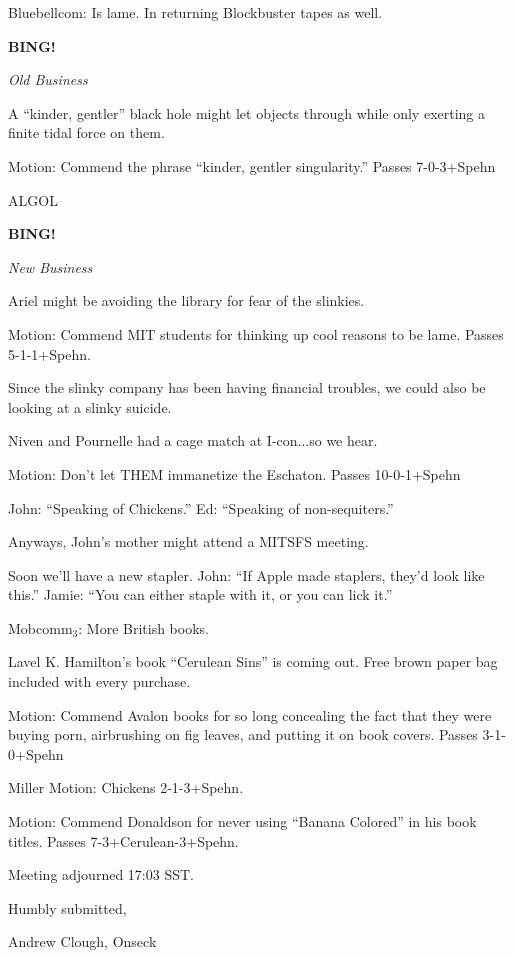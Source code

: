 \documentclass[12pt]{article}
\newcommand{\bing}{{\bf BING!} }
\newcommand{\goto}[1]{\bing \vskip 12pt \centerline{{\em{#1}}}}
\begin{document}
Bluebellcom:  Is lame.  In returning Blockbuster tapes as well.

\goto{Old Business}

A ``kinder, gentler'' black hole might let objects through while only exerting a finite tidal force on them.

Motion:  Commend the phrase ``kinder, gentler singularity.'' Passes 7-0-3+Spehn

ALGOL

\goto{New Business}

Ariel might be avoiding the library for fear of the slinkies.

Motion:  Commend MIT students for thinking up cool reasons to be lame.  Passes 5-1-1+Spehn.

Since the slinky company has been having financial troubles, we could also be looking at a slinky suicide.

Niven and Pournelle had a cage match at I-con...so we hear.

Motion:  Don't let THEM immanetize the Eschaton. Passes 10-0-1+Spehn

John:  ``Speaking of Chickens.''  Ed:  ``Speaking of non-sequiters.''

Anyways, John's mother might attend a MITSFS meeting.

Soon we'll have a new stapler.  John:  ``If Apple made staplers, they'd look like this.''  Jamie:  ``You can either staple with it, or you can lick it.''

Mobcomm$_3$:  More British books.

Lavel K. Hamilton's book ``Cerulean Sins'' is coming out.  Free brown paper bag included with every purchase.

Motion:   Commend Avalon books for so long concealing the fact that they were buying porn, airbrushing on fig leaves, and putting it on book covers.  Passes 3-1-0+Spehn

Miller Motion:  Chickens 2-1-3+Spehn.

Motion: Commend Donaldson for never using ``Banana Colored'' in his book titles.  Passes 7-3+Cerulean-3+Spehn.
\vspace{12pt}

\noindent
Meeting adjourned 17:03 SST.

\vspace{18pt}

\centerline{Humbly submitted,}
\centerline{Andrew Clough, Onseck}
\end{document}
